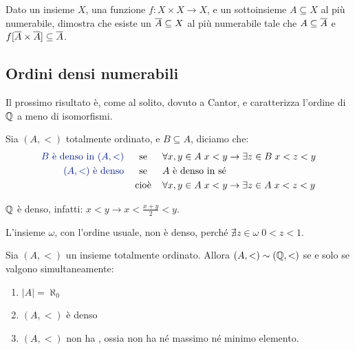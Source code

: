 \begin{exercise}
	Dato un insieme $X$, una funzione $f\colon X \times X \to X$, e un
sottoinsieme $A \subseteq X$ al pi\`u numerabile, dimostra che esiste un
$\overline A \subseteq X$ al pi\`u numerabile tale che $A \subseteq \overline A$ e~$f[\overline A \times \overline A] \subseteq \overline A$.
\end{exercise}

\subsection{Ordini densi numerabili}
Il prossimo risultato \`e, come al solito, dovuto a Cantor, e caratterizza l'ordine di $\mathbb Q$ a meno di isomorfismi.

\begin{definition}[Densit\`a]
	Sia $(A,<)$ totalmente ordinato, e $B \subseteq A$, diciamo che:
\begin{alignat*}{1}
\text{\drkblu $B$ \`e denso in $(A,<)$} \qquad \mathclap{\text{se}} \qquad
&\forall {x,y \in A} \; x < y \rightarrow \exists {z \in B} \; x < z < y \\
\text{\drkblu $(A, <)$ \`e denso} \qquad \mathclap{\text{se}} \qquad &\text{$A$ \`e
denso in s\'e} \\
\mathclap{\text{cio\`e}}\qquad &\forall {x,y \in A} \; x < y \rightarrow \exists {z \in A} \; x < z < y
\end{alignat*}
\end{definition}

\begin{example}
	$\mathbb Q$ \`e denso, infatti: $ x < y \rightarrow x < \frac{x+y}{2} <
y $.
\end{example}

\begin{notexample}
	L'insieme $\omega$, con l'ordine usuale, non \`e
denso, perch\'e $\nexists {z \in \omega} \; 0 < z < 1$.
\end{notexample}

\begin{theorem}
	\label{isoCantor}
	Sia $(A,<)$ un insieme totalmente ordinato. Allora
$(A,<)\sim(\mathbb Q,<)$ se e solo se valgono simultaneamente:
	\begin{enumerate}[1.]
		\item $|A| = \aleph_0$
		\item $(A,<)$ \`e denso
		\item $(A,<)$ non ha , ossia non ha n\'e
massimo n\'e minimo elemento.
	\end{enumerate}
\end{theorem}

